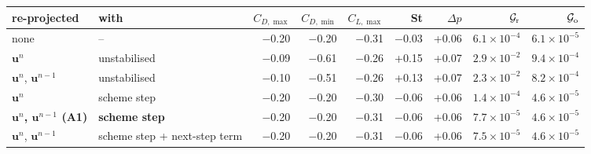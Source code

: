 \begin{tabular}{llrrrrrrr}
\toprule
re-projected & with & $C_{D,\max}$ & $C_{D,\min}$ & $C_{L,\max}$ & St & $\Delta p$ & $\mathcal{G}_{\rm r}$ & $\mathcal{G}_{\rm o}$ \\
\midrule
none & -- & $-$0.20 & $-$0.20 & $-$0.31 & $-$0.03 & +0.06 & $6.1\times10^{-4}$ & $6.1\times10^{-5}$ \\
$\mathbf{u}^n$ & unstabilised & $-$0.09 & $-$0.61 & $-$0.26 & +0.15 & +0.07 & $2.9\times10^{-2}$ & $9.4\times10^{-4}$ \\
$\mathbf{u}^n$, $\mathbf{u}^{n-1}$ & unstabilised & $-$0.10 & $-$0.51 & $-$0.26 & +0.13 & +0.07 & $2.3\times10^{-2}$ & $8.2\times10^{-4}$ \\
$\mathbf{u}^n$ & scheme step & $-$0.20 & $-$0.20 & $-$0.30 & $-$0.06 & +0.06 & $1.4\times10^{-4}$ & $4.6\times10^{-5}$ \\
\textbf{$\mathbf{u}^n$, $\mathbf{u}^{n-1}$ (A1)} & \textbf{scheme step} & $-$0.20 & $-$0.20 & $-$0.31 & $-$0.06 & +0.06 & $7.7\times10^{-5}$ & $4.6\times10^{-5}$ \\
$\mathbf{u}^n$, $\mathbf{u}^{n-1}$ & scheme step + next-step term & $-$0.20 & $-$0.20 & $-$0.31 & $-$0.06 & +0.06 & $7.5\times10^{-5}$ & $4.6\times10^{-5}$ \\
\bottomrule
\end{tabular}
